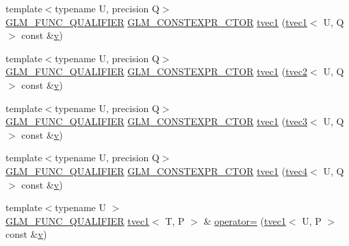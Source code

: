 \begin{DoxyCompactItemize}
{\footnotesize template$<$typename U, precision Q$>$ }\\\mbox{\hyperlink{setup_8hpp_a33fdea6f91c5f834105f7415e2a64407}{G\+L\+M\+\_\+\+F\+U\+N\+C\+\_\+\+Q\+U\+A\+L\+I\+F\+I\+ER}} \mbox{\hyperlink{setup_8hpp_ad34178a09666081abdb573c14d1f4a5a}{G\+L\+M\+\_\+\+C\+O\+N\+S\+T\+E\+X\+P\+R\+\_\+\+C\+T\+OR}} \mbox{\hyperlink{structglm_1_1tvec1_a87b45be425c692be0ff12e600c741d9c}{tvec1}} (\mbox{\hyperlink{structglm_1_1tvec1}{tvec1}}$<$ U, Q $>$ const \&\mbox{\hyperlink{glad_8h_a14cfbe2fc2234f5504618905b69d1e06}{v}})
\item 
{\footnotesize template$<$typename U, precision Q$>$ }\\\mbox{\hyperlink{setup_8hpp_a33fdea6f91c5f834105f7415e2a64407}{G\+L\+M\+\_\+\+F\+U\+N\+C\+\_\+\+Q\+U\+A\+L\+I\+F\+I\+ER}} \mbox{\hyperlink{setup_8hpp_ad34178a09666081abdb573c14d1f4a5a}{G\+L\+M\+\_\+\+C\+O\+N\+S\+T\+E\+X\+P\+R\+\_\+\+C\+T\+OR}} \mbox{\hyperlink{structglm_1_1tvec1_add32615332f25e7cc5abc5f34b57efc4}{tvec1}} (\mbox{\hyperlink{structglm_1_1tvec2}{tvec2}}$<$ U, Q $>$ const \&\mbox{\hyperlink{glad_8h_a14cfbe2fc2234f5504618905b69d1e06}{v}})
\item 
{\footnotesize template$<$typename U, precision Q$>$ }\\\mbox{\hyperlink{setup_8hpp_a33fdea6f91c5f834105f7415e2a64407}{G\+L\+M\+\_\+\+F\+U\+N\+C\+\_\+\+Q\+U\+A\+L\+I\+F\+I\+ER}} \mbox{\hyperlink{setup_8hpp_ad34178a09666081abdb573c14d1f4a5a}{G\+L\+M\+\_\+\+C\+O\+N\+S\+T\+E\+X\+P\+R\+\_\+\+C\+T\+OR}} \mbox{\hyperlink{structglm_1_1tvec1_a39a04679b7f07e1e629c77a6f86a969e}{tvec1}} (\mbox{\hyperlink{structglm_1_1tvec3}{tvec3}}$<$ U, Q $>$ const \&\mbox{\hyperlink{glad_8h_a14cfbe2fc2234f5504618905b69d1e06}{v}})
\item 
{\footnotesize template$<$typename U, precision Q$>$ }\\\mbox{\hyperlink{setup_8hpp_a33fdea6f91c5f834105f7415e2a64407}{G\+L\+M\+\_\+\+F\+U\+N\+C\+\_\+\+Q\+U\+A\+L\+I\+F\+I\+ER}} \mbox{\hyperlink{setup_8hpp_ad34178a09666081abdb573c14d1f4a5a}{G\+L\+M\+\_\+\+C\+O\+N\+S\+T\+E\+X\+P\+R\+\_\+\+C\+T\+OR}} \mbox{\hyperlink{structglm_1_1tvec1_a37a72fd06b4e08a6f6d5e7d85219435b}{tvec1}} (\mbox{\hyperlink{structglm_1_1tvec4}{tvec4}}$<$ U, Q $>$ const \&\mbox{\hyperlink{glad_8h_a14cfbe2fc2234f5504618905b69d1e06}{v}})
\item 
{\footnotesize template$<$typename U $>$ }\\\mbox{\hyperlink{setup_8hpp_a33fdea6f91c5f834105f7415e2a64407}{G\+L\+M\+\_\+\+F\+U\+N\+C\+\_\+\+Q\+U\+A\+L\+I\+F\+I\+ER}} \mbox{\hyperlink{structglm_1_1tvec1}{tvec1}}$<$ T, P $>$ \& \mbox{\hyperlink{structglm_1_1tvec1_afd831051f2b79ce40423c5c3c3113829}{operator=}} (\mbox{\hyperlink{structglm_1_1tvec1}{tvec1}}$<$ U, P $>$ const \&\mbox{\hyperlink{glad_8h_a14cfbe2fc2234f5504618905b69d1e06}{v}})

\end{DoxyCompactItemize}

